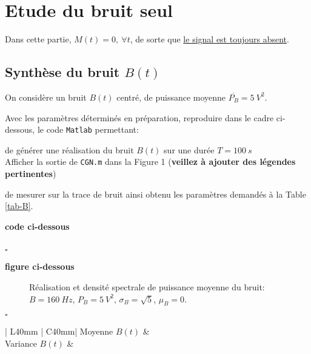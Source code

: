 \documentclass{article}
\newcommand{\debutrep}[1]{\color{blue}\begin{center} \hrulefill \textbf{ #1 } \hrulefill \end{center} }
\newcommand{\finrep}{\vspace*{5mm}\hfill $\square$\color{black}\vspace*{5mm}}
\begin{document}
\section{Etude du bruit seul}

Dans cette partie, $M(t) = 0,~\forall t$, de sorte que \underline{le signal est toujours absent}.

\subsection{Synthèse du bruit $B(t)$}
\label{sec:bruit-synthese}

On considère un bruit $B(t)$ centré, de puissance moyenne $\overline{P_B} = 5~V^2$.

Avec les paramètres déterminés en préparation, reproduire dans le cadre ci-dessous, le code {\tt Matlab} permettant:
\begin{list}{-}{\setlength{\leftmargin}{3mm} \setlength{\labelwidth}{20mm} \setlength{\labelsep}{2mm} \setlength{\itemsep}{1mm} }
\item de générer une réalisation du bruit $B(t)$ sur une durée $T=100~s$ \\ Afficher la sortie de {\tt CGN.m} dans la Figure 1 ({\bf veillez à ajouter des légendes pertinentes})
\item de mesurer sur la trace de bruit ainsi obtenu les paramètres demandés à la Table \ref{tab-B}.
\end{list}

\debutrep{code ci-dessous}
\begin{verbatim}

\end{verbatim}
\finrep


\debutrep{figure ci-dessous}
\begin{figure}

\caption{Réalisation et densité spectrale de puissance moyenne  du bruit: $B=160~Hz$, $P_B= 5~V^2$, $\sigma_B = \sqrt{5}$, $\mu_B=0$.}
\label{fig-B}
\end{figure}
\finrep

\begin{table}[h]
\begin{center}
\begin{tabular}{| L{40mm} | C{40mm}|}\hline
Moyenne $B(t)$ 		&  	\\[5mm] \hline
Variance $B(t)$ 		&  	\\[5mm] \hline
\end{tabular}
\end{center}
\label{table-B}
\caption{Mesures de la moyenne et de la variance de $B(t)$.}
\label{tab-B}
\end{table}
\end{document}
